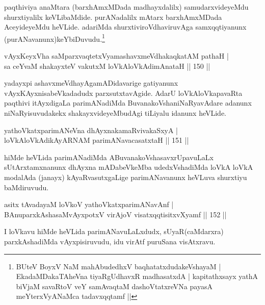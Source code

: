 \begin{artha}
paqthiviya anaMtara (barxhAmxMDada madhayxdalilx) samudarxvideyeMdu shurxtiyalilx keVLibaMdide. purANadalilx mAtarx barxhAmxMDada AceyideyeMdu heVLide. adariMda shurxtiviroVdhaviruvAga samxqqtiyanunx (purANavanunx)keYbiDuvudu.\footnote{BUteV BoyxV NaM mahAbudedhxV baqhatatxdudakeVshayaM |
 EkadaMDakaTAheVna tiyaRgUdhavxR madhasatxdA |
 kapitathxsayx yathA biVjaM savaRtoV veY samAvaqtaM
 dashoVtatxreVNa payasA meYterxVyANaMca tadavxqqtamf ||}
\end{artha}

\begin{shl}
vAyxKeyxVha saMparxvaqtetxVyamashavxmeVdhakaqkatAM pathaH |\\
sa ceYvaM shakayxteV vakutxM loVkAloVkAdimAnataH \hfill || 150 ||
\end{shl}

\begin{artha}
yadayxpi ashavxmeVdhayAgamADidavarige gatiyanunx vAyxKAyxnisabeVkadadudx parxsutxtavAgide. AdarU loVkAloVkapavaRta paqthivi itAyxdigaLa parimANadiMda BuvanakoVshaniNaRyavAdare adanunx niNaRyisuvudakekx shakayxvideyeMbudAgi tiLiyalu idanunx heVLide.
\end{artha}


\begin{shl}
yathoVkatxparimANeVna dhAyxnakamaRvivakaSxyA |\\
loVkAloVkAdikAyARNAM parimANavacasatxtaH \hfill || 151 ||
\end{shl}

\begin{artha}
hiMde heVLida parimANadiMda ABuvanakoVshasavxrUpavuLaLx sUtArxtamxnanunx dhAyxna mADabeVkeMba udedxVshadiMda loVkA loVkA modalAda (janayx) kAyaRvasutxgaLige parimANavanunx heVLuva shurxtiyu baMdiruvudu.
\end{artha}


\begin{shl}
asitx tAvadayaM loVkoV yathoVkatxparimANavAnf |\\
BAnuparxkAshasaMvAyxpotxV virAjoV visatxqqtisitxvXyamf \hfill || 152 ||
\end{shl}

\begin{artha}
I loVkavu hiMde heVLida parimANavuLaLxdudx, sUyaR(caMdarxra) parxkAshadiMda vAyxpisiruvudu, idu virAtf puruSana visAtxravu.
\end{artha}


